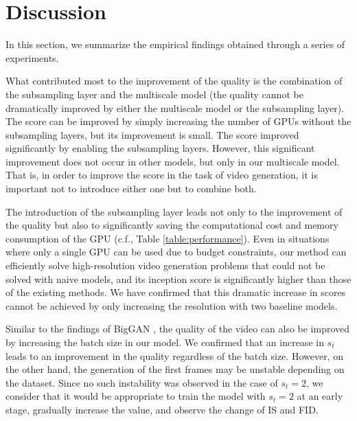 \documentclass[twocolumn]{svjour3}
\def\Table#1{Table \ref{table:#1}}
\begin{document}
\section{Discussion}

In this section, we summarize the empirical findings obtained through a series of experiments.










What contributed most to the improvement of the quality
is the combination of the subsampling layer and the multiscale model
(the quality cannot be dramatically improved by either the multiscale model or the subsampling layer).
The score can be improved by simply increasing the number of GPUs without the subsampling layers,
but its improvement is small.
The score improved significantly by enabling the subsampling layers.
However, this significant improvement does not occur in other models,
but only in our multiscale model.
That is, in order to improve the score in the task of video generation,
it is important not to introduce either one but to combine both.









The introduction of the subsampling layer leads not only to the improvement of the quality
but also to significantly saving the computational cost and memory consumption of the GPU
(c.f., \Table{performance}).
Even in situations where only a single GPU can be used due to budget constraints,
our method can efficiently solve high-resolution video generation problems
that could not be solved with naive models,
and its inception score is significantly higher than those of the existing methods.
We have confirmed that this dramatic increase in scores
cannot be achieved by only increasing the resolution with two baseline models.








Similar to the findings of BigGAN \cite{Brock2018}, the quality of the video can also be improved by increasing the batch size in our model.
We confirmed that an increase in $s_t$ leads to an improvement in the quality regardless of the batch size.
However, on the other hand, the generation of the first frames may be unstable depending on the dataset.
Since no such instability was observed in the case of $s_t=2$,
we consider that it would be appropriate to train the model with $s_t=2$ at an early stage,
gradually increase the value, and observe the change of IS and FID.
\end{document}
